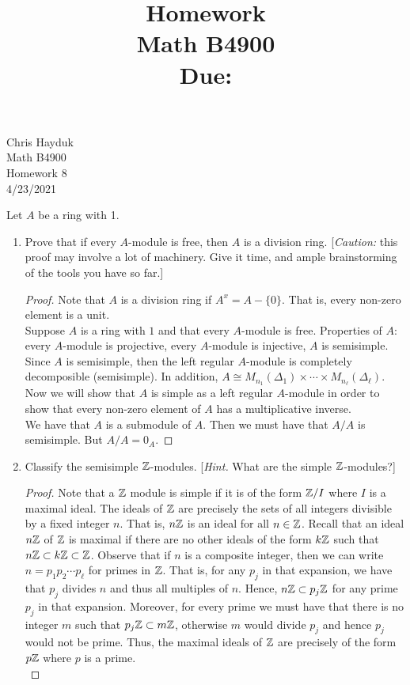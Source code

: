 \documentclass[11pt, reqno]{amsart}
\title[Homework \HW]{Homework \HW \\
Math B4900\\
\small Due: \DUE}
\author{}
\theoremstyle{plain}
\theoremstyle{definition}
\theoremstyle{example}
\def\HW{8}
\def\DUE{4/23/2021}
\begin{document}
\begin{flushright}
Chris Hayduk\\
Math B4900\\
Homework \HW\\
\DUE
\end{flushright}

Let $A$ be a ring with 1.
\begin{enumerate}[1.]
\item Prove that if every $A$-module is free, then $A$ is a division ring. {[\emph{Caution:} this proof may involve a lot of machinery. Give it time, and ample brainstorming of the tools you have so far.]}
\begin{proof}
Note that $A$ is a division ring if $A^x = A - \{0\}$. That is, every non-zero element is a unit.\\

Suppose $A$ is a ring with $1$ and that every $A$-module is free. Properties of $A$: every $A$-module is projective, every $A$-module is injective, $A$ is semisimple. Since $A$ is semisimple, then the left regular $A$-module is completely decomposible (semisimple). In addition, $A \cong M_{n_1}(\Delta_1) \times \cdots \times M_{n_{\ell}}(\Delta_{\ell})$.\\

Now we will show that $A$ is simple as a left regular $A$-module in order to show that every non-zero element of $A$ has a multiplicative inverse.\\

We have that $A$ is a submodule of $A$. Then we must have that $A/A$ is semisimple. But $A/A = 0_A$.

\end{proof}
\item Classify the semisimple $\mathbb{Z}$-modules. {[\emph{Hint.} What are the simple $\mathbb{Z}$-modules?]}

\begin{proof}
Note that a $\mathbb{Z}$ module is simple if it is of the form $\mathbb{Z}/I$ where $I$ is a maximal ideal. The ideals of $\mathbb{Z}$ are precisely the sets of all integers divisible by a fixed integer $n$. That is, $n\mathbb{Z}$ is an ideal for all $n \in \mathbb{Z}$. Recall that an ideal $n\mathbb{Z}$ of $\mathbb{Z}$ is maximal if there are no other ideals of the form $k\mathbb{Z}$ such that $n\mathbb{Z} \subset k\mathbb{Z} \subset \mathbb{Z}$. Observe that if $n$ is a composite integer, then we can write $n = p_1p_2 \cdots p_{\ell}$ for primes in $\mathbb{Z}$. That is, for any $p_j$ in that expansion, we have that $p_j$ divides $n$ and thus all multiples of $n$. Hence, $n\mathbb{Z} \subset p_j \mathbb{Z}$ for any prime $p_j$ in that expansion. Moreover, for every prime we must have that there is no integer $m$ such that $p_j \mathbb{Z} \subset m \mathbb{Z}$, otherwise $m$ would divide $p_j$ and hence $p_j$ would not be prime. Thus, the maximal ideals of $\mathbb{Z}$ are precisely of the form $p\mathbb{Z}$ where $p$ is a prime.\\


\end{proof}
\end{enumerate}
\end{document}
